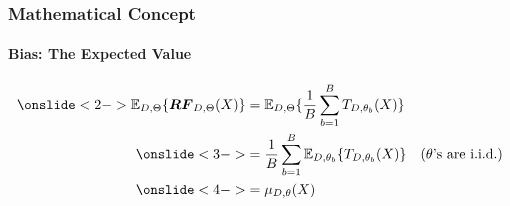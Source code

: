 \begin{frame}[c]
    \frametitle{Mathematical Concept}
    \framesubtitle{Bias: The Expected Value}
    \bigbreak
        \vspace{-5mm}
        \begin{align*}
            \onslide<2->\mathbb{E}_{D, \Theta}\{\boldsymbol{RF}_{D, \Theta}(X) \} 
            & = \mathbb{E}_{D, \Theta}\{\dfrac{1}{B}\sum_{b = 1}^{B}T_{D,\theta_{b}}(X)\}  \\
            \onslide<3->& = \dfrac{1}{B}\sum_{b=1}^{B}\mathbb{E}_{D,\theta_{b}}\{T_{D, \theta_{b}}(X)\} 
            & \text{($\theta$'s are i.i.d.)}\\
            \onslide<4->& = \mu_{D,\theta}(X)
        \end{align*}
\end{frame}

